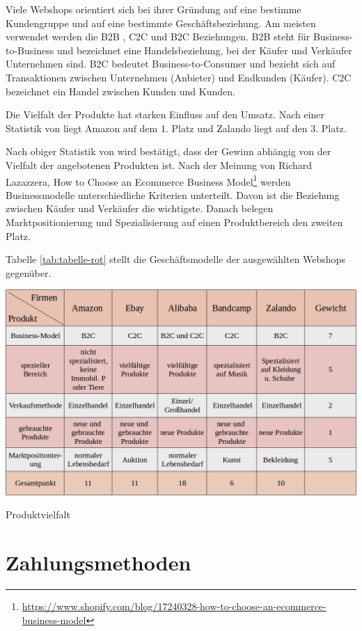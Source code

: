 Viele Webshops orientiert sich bei ihrer Gründung auf eine bestimme Kundengruppe und auf eine bestimmte Geschäftsbeziehung. Am meisten verwendet werden die B2B , C2C und B2C Beziehungen. B2B steht für Business-to-Business und bezeichnet eine Handelsbeziehung, bei der Käufer und Verkäufer Unternehmen sind. B2C bedeutet Business-to-Consumer und bezieht sich auf Transaktionen zwischen Unternehmen (Anbieter) und Endkunden (Käufer). C2C bezeichnet ein Handel zwischen Kunden und Kunden.

Die Vielfalt der Produkte hat starken Einfluss auf den Umsatz. Nach einer Statistik von \textcite{statista} liegt Amazon auf dem 1. Platz und Zalando liegt auf den 3. Platz.

Nach obiger Statistik von \textcite{statista} wird bestätigt, dass der Gewinn abhängig von der Vielfalt der angebotenen Produkten ist. Nach der Meinung von Richard Lazazzera, How to Choose an Ecommerce Business Model\footnote{\url{https://www.shopify.com/blog/17240328-how-to-choose-an-ecommerce-business-model}} werden Businessmodelle unterschiedliche Kriterien unterteilt. Davon ist die Beziehung zwischen Käufer und Verkäufer die wichtigste. Danach belegen Marktpositionierung und Spezialisierung auf einen Produktbereich den zweiten Platz.

Tabelle \vref{tab:tabelle-rot} stellt die Geschäftsmodelle der ausgewählten Webshops gegenüber.

\begin{table}[htbp]
	\centering
	\includegraphics[width=1\textwidth]{bilder/tabelle-rot.png}
	\caption{Produktvielfalt}
	\label{tab:tabelle-rot}
\end{table}


\section{Zahlungsmethoden}

